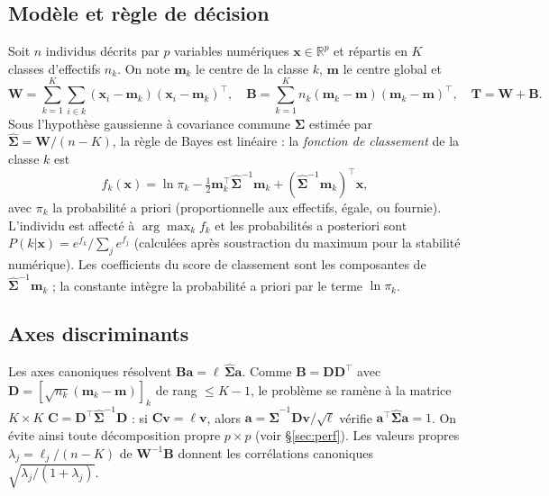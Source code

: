 \documentclass[10.5pt,a4paper]{article}
\newcommand{\bm}[1]{\mathbf{#1}}
\newcommand{\T}{^{\top}}
\begin{document}
\subsection{Mod\`ele et r\`egle de d\'ecision}
Soit $n$ individus d\'ecrits par $p$ variables num\'eriques $\bm{x}\in\mathbb{R}^p$ et r\'epartis en $K$ classes d'effectifs $n_k$. On note $\bm{m}_k$ le centre de la classe $k$, $\bm{m}$ le centre global et
\begin{equation}
\bm W=\sum_{k=1}^K\sum_{i\in k}(\bm x_i-\bm m_k)(\bm x_i-\bm m_k)\T,\quad
\bm B=\sum_{k=1}^K n_k(\bm m_k-\bm m)(\bm m_k-\bm m)\T,\quad \bm T=\bm W+\bm B .
\end{equation}
Sous l'hypoth\`ese gaussienne \`a covariance commune $\bm\Sigma$ estim\'ee par $\hat{\bm\Sigma}=\bm W/(n-K)$, la r\`egle de Bayes est lin\'eaire : la \emph{fonction de classement} de la classe $k$ est
\begin{equation}
f_k(\bm x)=\ln\pi_k-\tfrac12\bm m_k\T\hat{\bm\Sigma}^{-1}\bm m_k+(\hat{\bm\Sigma}^{-1}\bm m_k)\T\bm x ,
\label{eq:fk}
\end{equation}
avec $\pi_k$ la probabilit\'e a priori (proportionnelle aux effectifs, \'egale, ou fournie). L'individu est affect\'e \`a $\arg\max_k f_k$ et les probabilit\'es a posteriori sont $P(k|\bm x)=e^{f_k}/\sum_j e^{f_j}$ (calcul\'ees apr\`es soustraction du maximum pour la stabilit\'e num\'erique). Les coefficients du score de classement sont les composantes de $\hat{\bm\Sigma}^{-1}\bm m_k$ ; la constante int\`egre la probabilit\'e a priori par le terme $\ln\pi_k$.

\subsection{Axes discriminants}
Les axes canoniques r\'esolvent $\bm B\bm a=\ell\,\hat{\bm\Sigma}\bm a$. Comme $\bm B=\bm D\bm D\T$ avec $\bm D=[\sqrt{n_k}(\bm m_k-\bm m)]_k$ de rang $\le K-1$, le probl\`eme se ram\`ene \`a la matrice $K\times K$ $\bm C=\bm D\T\hat{\bm\Sigma}^{-1}\bm D$ : si $\bm C\bm v=\ell\bm v$, alors $\bm a=\hat{\bm\Sigma}^{-1}\bm D\bm v/\sqrt{\ell}$ v\'erifie $\bm a\T\hat{\bm\Sigma}\bm a=1$. On \'evite ainsi toute d\'ecomposition propre $p\times p$ (voir \S\ref{sec:perf}). Les valeurs propres $\lambda_j=\ell_j/(n-K)$ de $\bm W^{-1}\bm B$ donnent les corr\'elations canoniques $\sqrt{\lambda_j/(1+\lambda_j)}$.
\end{document}
